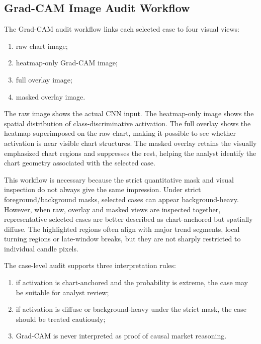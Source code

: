 \subsection{Grad-CAM Image Audit Workflow}
\label{subsec:image_audit_workflow}

The Grad-CAM audit workflow links each selected case to four visual views:

\begin{enumerate}
    \item raw chart image;
    \item heatmap-only Grad-CAM image;
    \item full overlay image;
    \item masked overlay image.
\end{enumerate}

The raw image shows the actual CNN input. The heatmap-only image shows the spatial distribution of class-discriminative activation. The full overlay shows the heatmap superimposed on the raw chart, making it possible to see whether activation is near visible chart structures. The masked overlay retains the visually emphasized chart regions and suppresses the rest, helping the analyst identify the chart geometry associated with the selected case.

This workflow is necessary because the strict quantitative mask and visual inspection do not always give the same impression. Under strict foreground/background masks, selected cases can appear background-heavy. However, when raw, overlay and masked views are inspected together, representative selected cases are better described as chart-anchored but spatially diffuse. The highlighted regions often align with major trend segments, local turning regions or late-window breaks, but they are not sharply restricted to individual candle pixels.

The case-level audit supports three interpretation rules:

\begin{enumerate}
    \item if activation is chart-anchored and the probability is extreme, the case may be suitable for analyst review;
    \item if activation is diffuse or background-heavy under the strict mask, the case should be treated cautiously;
    \item Grad-CAM is never interpreted as proof of causal market reasoning.
\end{enumerate}

